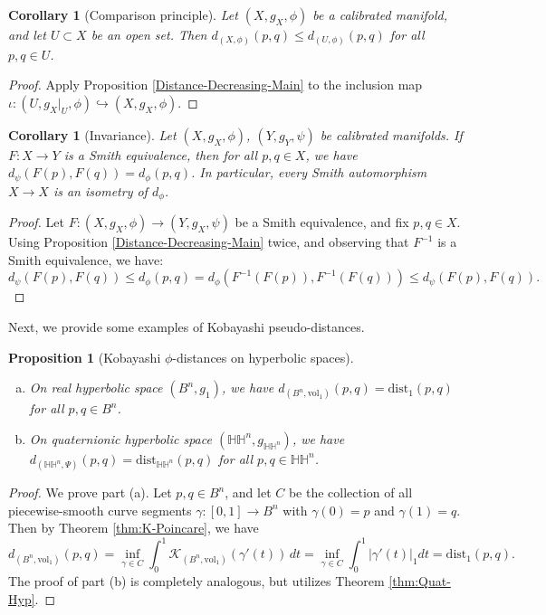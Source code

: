 \documentclass[11pt]{article}
\newcommand{\vol}{\mathrm{vol}}
\newtheorem{prop}[thm]{Proposition}
\newtheorem{cor}[thm]{Corollary}
\theoremstyle{definition}
\numberwithin{equation}{section}
\begin{document}
\begin{cor}[Comparison principle] \label{cor:Comparison-dist} Let $(X, g_X, \phi)$ be a calibrated manifold, and let $U \subset X$ be an open set.  Then $d_{(X, \phi)}(p,q) \leq d_{(U, \phi)}(p,q)$ for all $p,q \in U$.
\end{cor}

\begin{proof} Apply Proposition \ref{Distance-Decreasing-Main} to the inclusion map $\iota \colon (U, g_X|_U, \phi) \hookrightarrow (X, g_X, \phi)$.
\end{proof}

\begin{cor}[Invariance] \label{cor:Invariance-Distance} Let $(X, g_X, \phi)$, $(Y, g_Y, \psi)$ be calibrated manifolds.  If $F \colon X \to Y$ is a Smith equivalence, then for all $p,q \in X$, we have $d_\psi(F(p), F(q)) = d_\phi(p,q)$.  In particular, every Smith automorphism $X \to X$ is an isometry of $d_\phi$.
\end{cor}

\begin{proof} Let $F \colon (X, g_X, \phi) \to (Y, g_X, \psi)$ be a Smith equivalence, and fix $p,q \in X$.  Using Proposition \ref{Distance-Decreasing-Main} twice, and observing that $F^{-1}$ is a Smith equivalence, we have:
$$d_\psi( F(p), F(q) ) \leq d_\phi( p, q ) = d_\phi( F^{-1}( F(p) ), F^{-1}( F(q) ) ) \leq d_\psi( F(p), F(q)).$$
\end{proof}

\indent Next, we provide some examples of Kobayashi pseudo-distances.

\begin{prop}[Kobayashi $\phi$-distances on hyperbolic spaces] \label{prop:HypSpaces-KobHyp} ${}$
\begin{enumerate}[(a)]
\item On real hyperbolic space $(B^n, g_1)$, we have $d_{(B^n, \vol_1)}(p,q) = \mathrm{dist}_1(p,q)$ for all $p,q \in B^n$.
\item On quaternionic hyperbolic space $(\mathbb{HH}^n, g_{\mathbb{HH}^n})$, we have  $d_{(\mathbb{HH}^n, \Psi)}(p,q) = \mathrm{dist}_{\mathbb{HH}^n}(p,q)$ for all $p,q \in \mathbb{HH}^n$.
\end{enumerate}
\end{prop}

\begin{proof} We prove part (a).  Let $p,q \in B^n$, and let $C$ be the collection of all piecewise-smooth curve segments $\gamma \colon [0,1] \to B^n$ with $\gamma(0) = p$ and $\gamma(1) = q$.  Then by Theorem \ref{thm:K-Poincare}, we have
$$d_{(B^n, \vol_1)}(p,q) = \inf_{\gamma \in C} \int_0^1 \mathcal{K}_{(B^n, \vol_1)}(\gamma'(t))\,dt = \inf_{\gamma \in C} \int_0^1 \left| \gamma'(t) \right|_1 dt = \mathrm{dist}_1(p,q).$$
The proof of part (b) is completely analogous, but utilizes Theorem \ref{thm:Quat-Hyp}.
\end{proof}
\end{document}
